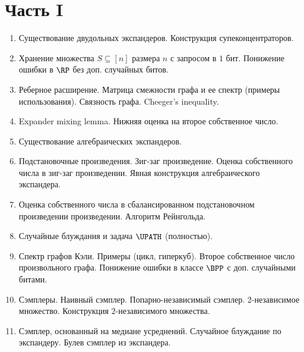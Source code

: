 

\newcommand{\norm}[1]{\left\lVert#1\right\rVert}




\section*{Часть I}
\begin{enumerate}
    \item Существование двудольных экспандеров. Конструкция супеконцентраторов.
    \item Хранение множества $S \subseteq [n]$ размера $n$ с запросом в $1$ бит. Понижение ошибки в $\RP$
        без доп. случайных битов.
    \item Реберное расширение. Матрица смежности графа и ее спектр (примеры использования). Связность
        графа. Cheeger's inequality.
    \item Expander mixing lemma. Нижняя оценка на второе собственное число.
    \item Существование алгебраических экспандеров.
    \item Подстановочные произведения. Зиг-заг произведение. Оценка собственного числа в зиг-заг произведении. Явная
        конструкция алгебраического экспандера.
    \item Оценка собственного числа в сбалансированном подстановочном произведении произведении.
        Алгоритм Рейнгольда.
    \item Случайные блуждания и задача $\UPATH$ (полностью).
    \item Спектр графов Кэли. Примеры (цикл, гиперкуб). Второе собственное число произвольного
        графа. Понижение ошибки в классе $\BPP$ с доп. случайными битами. 
    \item Сэмплеры. Наивный сэмплер. Попарно-независимый сэмплер. $2$-независимое множество. Конструкция
        $2$-независимого множества.
    \item Сэмплер, основанный на медиане усреднений. Случайное блуждание по экспандеру. Булев сэмплер из
        экспандера.
\end{enumerate}

